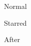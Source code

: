 \documentclass{\cls}
\begin{document}
\listoffigures
\begin{figure}[h]\caption{Normal}\end{figure}
\begin{figure}[h]\caption*{Starred}\end{figure}
\begin{figure}[h]\caption{After}\end{figure}
\end{document}

